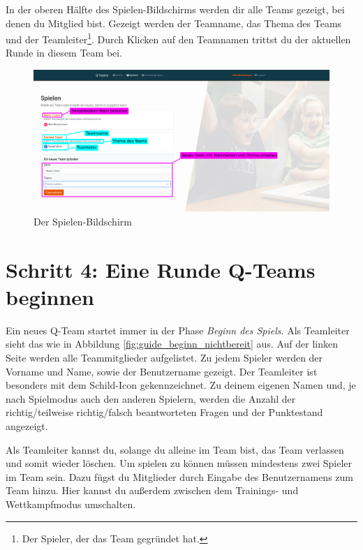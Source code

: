 \documentclass[a4paper,11pt,listof=numbered,glossary=totoc,parskip=half,toc=bib]{scrreprt}
\begin{document}
\begin{appendices}
	In der oberen Hälfte des Spielen-Bildschirms werden dir alle Teams gezeigt, bei denen du Mitglied bist. Gezeigt werden der Teamname, das Thema des Teams und der Teamleiter\footnote{Der Spieler, der das Team gegründet hat.}. Durch Klicken auf den Teamnamen trittst du der aktuellen Runde in diesem Team bei.
	
	\begin{figure}[h!]
		\centering
		\includegraphics[width=\textwidth]{UserGuide/Spielen.png}
		\caption{Der Spielen-Bildschirm}
		\label{fig:guide_spielen}
	\end{figure}
	
	\newpage
	\section*{Schritt 4: Eine Runde Q-Teams beginnen}
	
	Ein neues Q-Team startet immer in der Phase \textit{Beginn des Spiels}. Als Teamleiter sieht das wie in Abbildung \ref{fig:guide_beginn_nichtbereit} aus. Auf der linken Seite werden alle Teammitglieder aufgelistet. Zu jedem Spieler werden der Vorname und Name, sowie der Benutzername gezeigt. Der Teamleiter ist besonders mit dem Schild-Icon gekennzeichnet. Zu deinem eigenen Namen und, je nach Spielmodus auch den anderen Spielern, werden die Anzahl der richtig/teilweise richtig/falsch beantworteten Fragen und der Punktestand angezeigt.
	
	Als Teamleiter kannst du, solange du alleine im Team bist, das Team verlassen und somit wieder löschen. Um spielen zu können müssen mindestens zwei Spieler im Team sein. Dazu fügst du Mitglieder durch Eingabe des Benutzernamens zum Team hinzu. Hier kannst du außerdem zwischen dem Trainings- und Wettkampfmodus umschalten.
	

\end{appendices}
\end{document}
